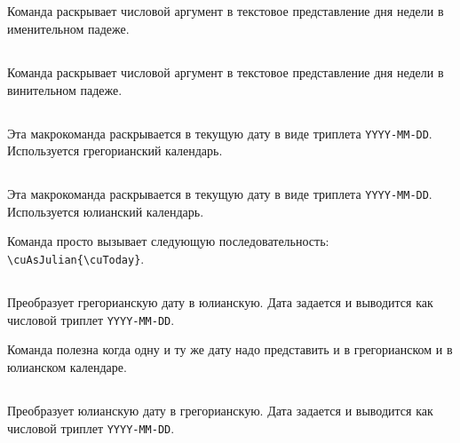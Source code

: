 \begin{RU}
\subsection{}
Команда раскрывает числовой аргумент в текстовое представление дня недели в именительном падеже.

\subsection{}
Команда раскрывает числовой аргумент в текстовое представление дня недели в винительном падеже.

\subsection{}
Эта макрокоманда раскрывается в текущую дату в виде триплета \texttt{YYYY-MM-DD}. Используется грегорианский календарь.

\subsection{}
Эта макрокоманда раскрывается в текущую дату в виде триплета \texttt{YYYY-MM-DD}. Используется юлианский календарь.

Команда просто вызывает следующую последовательность:  \verb+\cuAsJulian{\cuToday}+.

\subsection{}
Преобразует грегорианскую дату в юлианскую. Дата задается и выводится как числовой триплет \texttt{YYYY-MM-DD}.

Команда полезна когда одну и ту же дату надо представить и в грегорианском и в юлианском календаре.

\subsection{}
Преобразует юлианскую дату в грегорианскую. Дата задается и выводится как числовой триплет \texttt{YYYY-MM-DD}.

\end{RU}

